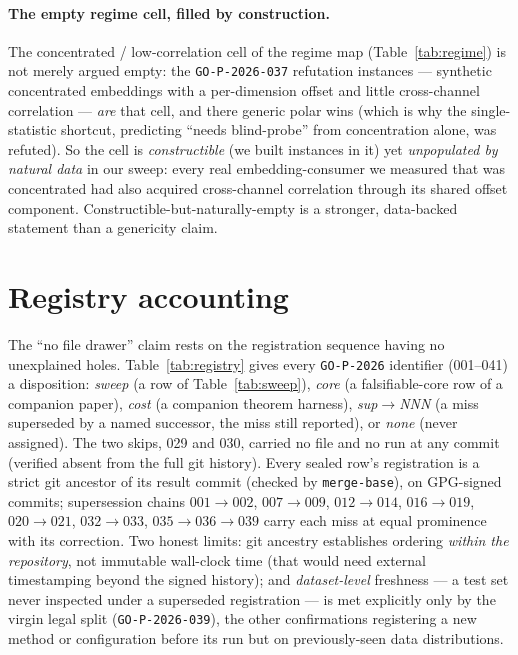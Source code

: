 \documentclass[11pt]{article}
\theoremstyle{remark}
\newcommand{\seal}[1]{\texttt{GO-P-2026-#1}}
\begin{document}
\paragraph{The empty regime cell, filled by construction.} The concentrated /
low-correlation cell of the regime map (Table~\ref{tab:regime}) is not merely argued empty:
the \seal{037} refutation instances --- synthetic concentrated embeddings with a per-dimension
offset and little cross-channel correlation --- \emph{are} that cell, and there generic polar
wins (which is why the single-statistic shortcut, predicting ``needs blind-probe'' from
concentration alone, was refuted). So the cell is \emph{constructible} (we built instances in
it) yet \emph{unpopulated by natural data} in our sweep: every real embedding-consumer we
measured that was concentrated had also acquired cross-channel correlation through its shared
offset component. Constructible-but-naturally-empty is a stronger, data-backed statement than
a genericity claim.

\section{Registry accounting}\label{app:registry}
The ``no file drawer'' claim rests on the registration sequence having no unexplained holes.
Table~\ref{tab:registry} gives every \texttt{GO-P-2026} identifier (001--041) a disposition:
\emph{sweep} (a row of Table~\ref{tab:sweep}), \emph{core} (a falsifiable-core row of a
companion paper), \emph{cost} (a companion theorem harness), \emph{sup$\to$NNN} (a miss
superseded by a named successor, the miss still reported), or \emph{none} (never assigned).
The two skips, 029 and 030, carried no file and no run at any commit (verified absent from
the full git history). Every sealed row's registration is a strict git ancestor of its
result commit (checked by \texttt{merge-base}), on GPG-signed commits; supersession chains
$001{\to}002$, $007{\to}009$, $012{\to}014$, $016{\to}019$, $020{\to}021$, $032{\to}033$,
$035{\to}036{\to}039$ carry each miss at equal prominence with its correction. Two honest
limits: git ancestry establishes ordering \emph{within the repository}, not immutable
wall-clock time (that would need external timestamping beyond the signed history); and
\emph{dataset-level} freshness --- a test set never inspected under a superseded
registration --- is met explicitly only by the virgin legal split (\seal{039}), the other
confirmations registering a new method or configuration before its run but on
previously-seen data distributions.
\end{document}
